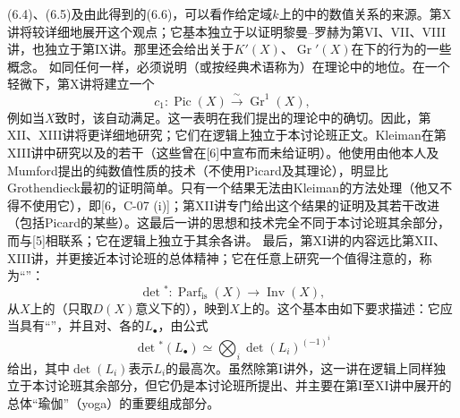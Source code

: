 (6.4)、(6.5)及由此得到的(6.6)，可以看作给定域$k$上的中的数值关系的来源。第X讲将较详细地展开这个观点；它基本独立于以证明黎曼--罗赫为第VI、VII、VIII讲，也独立于第IX讲。那里还会给出关于$K'(X)$、$\operatorname{Gr}'(X)$在下的行为的一些概念。
如同任何一样，必须说明（或按经典术语称为）在理论中的地位。在一个轻微下，第X讲将建立一个
\[c_1:\operatorname{Pic}(X)\xrightarrow{\sim}\operatorname{Gr}^1(X),\tag{7.1}\]
例如当$X$致时，该自动满足。这一表明在我们提出的理论中的确切。因此，第XII、XIII讲将更详细地研究；它们在逻辑上独立于本讨论班正文。Kleiman在第XIII讲中研究以及的若干（这些曾在[6]中宣布而未给证明）。他使用由他本人及Mumford提出的纯数值性质的技术（不使用Picard及其理论），明显比Grothendieck最初的证明简单。只有一个结果无法由Kleiman的方法处理（他又不得不使用它），即[6，C-07 (i)]；第XII讲专门给出这个结果的证明及其若干改进（包括Picard的某些）。这最后一讲的思想和技术完全不同于本讨论班其余部分，而与[5]相联系；它在逻辑上独立于其余各讲。
最后，第XI讲的内容远比第XII、XIII讲，并更接近本讨论班的总体精神；它在任意上研究一个值得注意的，称为“”：
\[\det{}^*:\operatorname{Parf}_{\mathrm{is}}(X)\longrightarrow\operatorname{Inv}(X),\tag{7.2}\]
从$X$上的（只取$D(X)$意义下的），映到$X$上的。这个基本由如下要求描述：它应当具有“”，并且对、各的$L_{\bullet}$，由公式
\[\det{}^*(L_{\bullet})\simeq\bigotimes_i\det(L_i)^{(-1)^i}\tag{7.3}\]
给出，其中$\det(L_i)$表示$L_i$的最高次。虽然除第I讲外，这一讲在逻辑上同样独立于本讨论班其余部分，但它仍是本讨论班所提出、并主要在第I至XI讲中展开的总体“瑜伽”（yoga）的重要组成部分。
